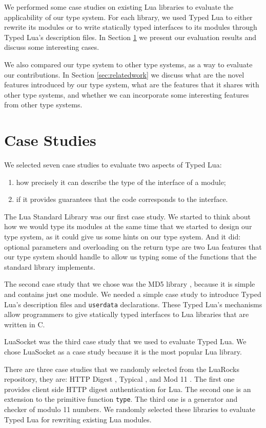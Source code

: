 
We performed some case studies on existing Lua libraries
to evaluate the applicability of our type system.
For each library, we used Typed Lua to either rewrite its modules
or to write statically typed interfaces to its modules through
Typed Lua's description files.
In Section \ref{sec:cases} we present our evaluation results
and discuss some interesting cases.

We also compared our type system to other type systems,
as a way to evaluate our contributions.
In Section \ref{sec:relatedwork} we discuss what are the novel
features introduced by our type system,
what are the features that it shares with other type systems,
and whether we can incorporate some interesting features from
other type systems.

\section{Case Studies}
\label{sec:cases}

We selected seven case studies to evaluate two aspects of Typed Lua:
\begin{enumerate}
\item how precisely it can describe the type of the interface of a module;
\item if it provides guarantees that the code corresponds to the interface.
\end{enumerate}

The Lua Standard Library \citep{luamanual} was our first case study.
We started to think about how we would type its modules at the same time
that we started to design our type system, as it could give us some
hints on our type system.
And it did: optional parameters and overloading on the return type
are two Lua features that our type system should handle to allow us
typing some of the functions that the standard library implements.

The second case study that we chose was the MD5 library \citep{lmd5},
because it is simple and contains just one module.
We needed a simple case study to introduce Typed Lua's description
files and \texttt{userdata} declarations.
These Typed Lua's mechanisms allow programmers to give statically typed
interfaces to Lua libraries that are written in C.

LuaSocket \citep{luasocket} was the third case study that we used to
evaluate Typed Lua.
We chose LuaSocket as a case study because it is the most popular Lua library.

There are three case studies that we randomly selected from the LuaRocks
repository, they are: HTTP Digest \citep{luahttpdigest},
Typical \citep{luatypical}, and Mod 11 \citep{luamod11}.
The first one provides client side HTTP digest authentication for Lua.
The second one is an extension to the primitive function \texttt{type}.
The third one is a generator and checker of modulo 11 numbers.
We randomly selected these libraries to evaluate Typed Lua for
rewriting existing Lua modules.

